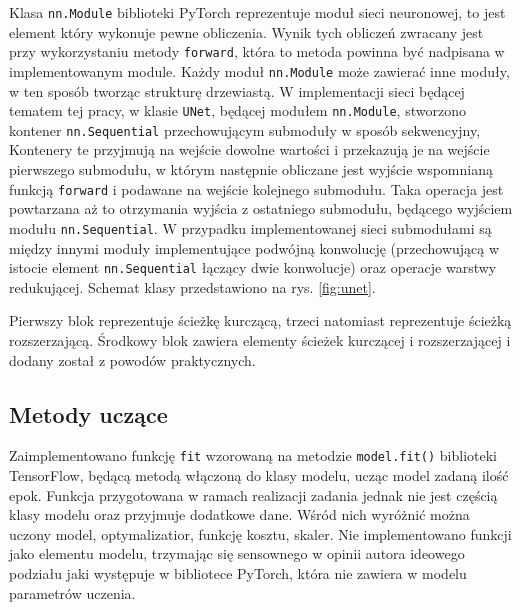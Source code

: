 Klasa \texttt{nn.Module}  biblioteki PyTorch reprezentuje moduł sieci neuronowej, to jest element który wykonuje pewne obliczenia. Wynik tych obliczeń zwracany jest przy wykorzystaniu metody \texttt{forward}, która to metoda powinna być nadpisana w implementowanym module.  Każdy moduł \texttt{nn.Module} może zawierać inne moduły, w ten sposób tworząc strukturę drzewiastą. W implementacji sieci będącej tematem  tej pracy, w klasie \texttt{UNet}, będącej  modułem \texttt{nn.Module}, stworzono kontener \texttt{nn.Sequential} przechowującym submoduły w sposób sekwencyjny, Kontenery te przyjmują na  wejście dowolne wartości i przekazują je na wejście pierwszego submodułu, w którym następnie obliczane jest wyjście wspomnianą funkcją \texttt{forward} i podawane na wejście kolejnego submodułu. Taka operacja jest powtarzana aż to otrzymania wyjścia z ostatniego submodułu, będącego wyjściem modułu \texttt{nn.Sequential}. W przypadku implementowanej sieci submodułami są między innymi moduły implementujące podwójną konwolucję (przechowującą w istocie element \texttt{nn.Sequential} łączący dwie konwolucje) oraz operacje warstwy redukującej. Schemat klasy przedstawiono na rys. \ref{fig:unet}.


\par
Pierwszy blok reprezentuje ścieżkę kurczącą, trzeci natomiast reprezentuje ścieżką rozszerzającą. Środkowy blok zawiera elementy ścieżek kurczącej i rozszerzającej i dodany został z powodów praktycznych.
\subsection{Metody uczące}
\par
Zaimplementowano funkcję \texttt{fit} wzorowaną na metodzie \texttt{model.fit()} biblioteki TensorFlow, będącą metodą włączoną do klasy  modelu, ucząc model zadaną ilość epok. Funkcja przygotowana w ramach realizacji zadania jednak nie jest częścią  klasy modelu oraz przyjmuje dodatkowe dane. Wśród nich wyróżnić można uczony model, optymalizatior, funkcję kosztu, skaler. Nie implementowano funkcji jako elementu modelu, trzymając się sensownego w opinii autora ideowego podziału jaki występuje w bibliotece PyTorch, która nie zawiera w modelu  parametrów uczenia.




